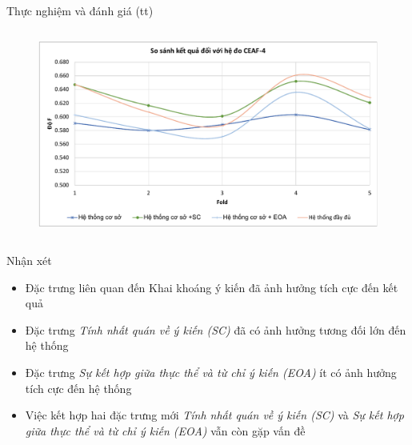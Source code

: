 \documentclass[9pt,xcolor=table,hyperref=unicode]{beamer}
\begin{document}
		\begin{frame}[t]{Thực nghiệm và đánh giá (tt)}								
			\begin{columns}[t]
				\begin{column}{\textwidth}
					\begin{figure}[H] 			
						\centering					
						\includegraphics[scale=0.35]{charts/chart_ceaf4.pdf}										
					\end{figure} 				
				\end{column}
			\end{columns}
			\begin{columns}[t]
				\begin{column}{\textwidth}
					\begin{block}{Nhận xét}
						\footnotesize		
						\begin{itemize}
							\item{Đặc trưng liên quan đến Khai khoáng ý kiến đã ảnh hưởng tích cực đến kết quả}
							\item{Đặc trưng \textit{Tính nhất quán về ý kiến (SC)} đã có ảnh hưởng tương đối lớn đến hệ thống}
							\item{Đặc trưng \textit{Sự kết hợp giữa thực thể và từ chỉ ý kiến (EOA)} ít có ảnh hưởng tích cực đến hệ thống}
							\item{Việc kết hợp hai đặc trưng mới \textit{Tính nhất quán về ý kiến (SC)} và \textit{Sự kết hợp giữa thực thể và từ chỉ ý kiến (EOA)} vẫn còn gặp vấn đề}
						\end{itemize}			
					\end{block}
				\end{column}				
			\end{columns}						
		\end{frame}	
\end{document}
